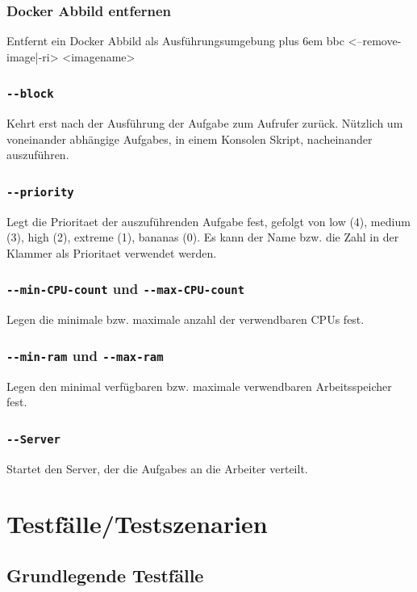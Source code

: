 \documentclass[a4paper,12pt]{article}
\makeatletter
\newenvironment{mycode}
 {\def\@xobeysp{\ }\verbatim\rightskip=0pt plus 6em\relax}
 {\endverbatim}
\makeatother
\begin{document}
\subsubsection{Docker Abbild entfernen}
Entfernt ein \gls{Docker} Abbild als Ausführungsumgebung
\begin{mycode}
bbc <--remove-image|-ri> <imagename>
\end{mycode}

\subsubsection{\texttt{-{}-block}}
Kehrt erst nach der Ausführung der \gls{Aufgabe} zum Aufrufer zurück. Nützlich um voneinander abhängige \glspl{Aufgabe}, in einem Konsolen Skript, nacheinander auszuführen.

\subsubsection{\texttt{-{}-priority}}
Legt die \gls{Prioritaet} der auszuführenden \gls{Aufgabe} fest, gefolgt von low (4), medium (3), high (2), extreme (1), bananas (0).
Es kann der Name bzw. die Zahl in der Klammer als \gls{Prioritaet} verwendet werden.

\subsubsection{\texttt{-{}-min-\gls{CPU}-count} und \texttt{-{}-max-\gls{CPU}-count}}
Legen die minimale bzw. maximale anzahl der verwendbaren \glspl{CPU} fest.

\subsubsection{\texttt{-{}-min-ram} und \texttt{-{}-max-ram}}
Legen den minimal verfügbaren bzw. maximale verwendbaren Arbeitsspeicher fest.

\subsubsection{\texttt{-{}-\gls{Server}}}
Startet den \gls{Server}, der die \glspl{Aufgabe} an die Arbeiter verteilt.


\clearpage
\section{Testfälle/Testszenarien}
\subsection{Grundlegende Testfälle}
\end{document}
